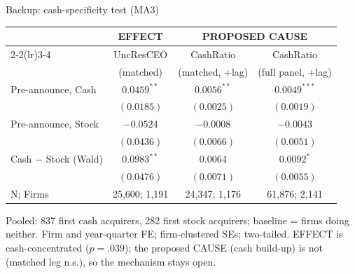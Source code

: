 \documentclass[aspectratio=169, 11pt]{beamer}
\begin{document}
\begin{frame}[noframenumbering]{Backup: cash-specificity test (MA3)}
  \begin{center}
  \small
  \begin{tabular}{lccc}
    \toprule
    & EFFECT & \multicolumn{2}{c}{PROPOSED CAUSE} \\
    \cmidrule(lr){2-2}\cmidrule(lr){3-4}
    & UncResCEO & CashRatio & CashRatio \\
    & (matched) & (matched, +lag) & (full panel, +lag) \\
    \midrule
    Pre-announce, Cash & $\mathbf{0.0459}^{**}$ & $\mathbf{0.0056}^{**}$ & $\mathbf{0.0049}^{***}$ \\
    & $(0.0185)$ & $(0.0025)$ & $(0.0019)$ \\
    Pre-announce, Stock & $-0.0524$ & $-0.0008$ & $-0.0043$ \\
    & $(0.0436)$ & $(0.0066)$ & $(0.0051)$ \\
    \midrule
    Cash $-$ Stock (Wald) & $\mathbf{0.0983}^{**}$ & $0.0064$ & $\mathbf{0.0092}^{*}$ \\
    & $(0.0476)$ & $(0.0071)$ & $(0.0055)$ \\
    \midrule
    N; Firms & 25{,}600; 1{,}191 & 24{,}347; 1{,}176 & 61{,}876; 2{,}141 \\
    \bottomrule
  \end{tabular}
  \end{center}
  {\scriptsize Pooled: 837 first cash acquirers, 282 first stock acquirers;
  baseline = firms doing neither. Firm and year-quarter FE; firm-clustered SEs;
  two-tailed. EFFECT is cash-concentrated ($p=.039$); the proposed CAUSE
  (cash build-up) is not (matched leg n.s.), so the mechanism stays open.}
\end{frame}
\end{document}
